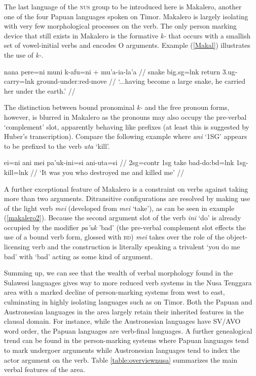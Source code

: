The last language of the \textsc{nus} group to be introduced here is Makalero, another one of the four Papuan languages spoken on Timor. Makalero is largely isolating with very few morphological processes on the verb. The only person marking device that still exists in Makalero is the formative \textit{k-} that occurs with a smallish set of vowel-initial verbs and encodes O arguments. Example (\ref{Makal}) illustrates the use of \textit{k-}.

\ex \label{Makal}
\begingl
\gla nana pere=ni muni k-afu=ni + mu’a-ia-la’a // 
\glb snake big.\acs{sg}=\acs{lnk} return \acs{3}.\acs{ug}-carry=\acs{lnk} ground-under:\acs{red}-move //
\glft `...having become a large snake, he carried her under the earth.’ // 
\endgl
\xe

The distinction between bound pronominal \textit{k-} and the free pronoun forms, however, is blurred in Makalero as the pronouns may also occupy the pre-verbal `complement' slot, apparently behaving like prefixes (at least this is suggested by Huber's transcription). Compare the following example where \textit{ani} `1SG' appears to be prefixed to the verb \textit{uta} `kill'.

\ex \label{makalero2}
\begingl
\gla ei=ni ani mei pa’uk-ini=si ani-uta=si // 
\glb \acs{2}\acs{sg}=\acs{contr} \acs{1}\acs{sg} take bad-do:\acs{bd}=\acs{lnk} \acs{1}\acs{sg}-kill=\acs{lnk} //
\glft `It was you who destroyed me and killed me’ // 
\endgl
\xe

A further exceptional feature of Makalero is a constraint on verbs against taking more than two arguments. Ditransitive configurations are resolved by making use of the light verb \textit{mei} (developed from \textit{mei} `take'), as can be seen in example (\ref{makalero2}). Because the second argument slot of the verb \textit{ini} `do' is already occupied by the modifier \textit{pa'uk} 'bad' (the pre-verbal complement slot effects the use of a bound verb form, glossed with \textsc{bd}) \textit{mei} takes over the role of the object-licensing verb and the construction is literally speaking a trivalent `you do me bad' with `bad' acting as some kind of argument.

Summing up, we can see that the wealth of verbal morphology found in the Sulawesi languages gives way to more reduced verb systems in the Nusa Tenggara area with a marked decline of person-marking systems from west to east, culminating in highly isolating languages such as  on Timor. Both the Papuan and Austronesian languages in the area largely retain their inherited features in the clausal domain. For instance, while the Austronesian languages have SV/AVO word order, the Papuan languages are verb-final languages. A further genealogical trend can be found in the person-marking systems where Papuan languages tend to mark undergoer arguments while Austronesian languages tend to index the actor argument on the verb. Table \ref{table:overviewnusa} summarizes the main verbal features of the area.

